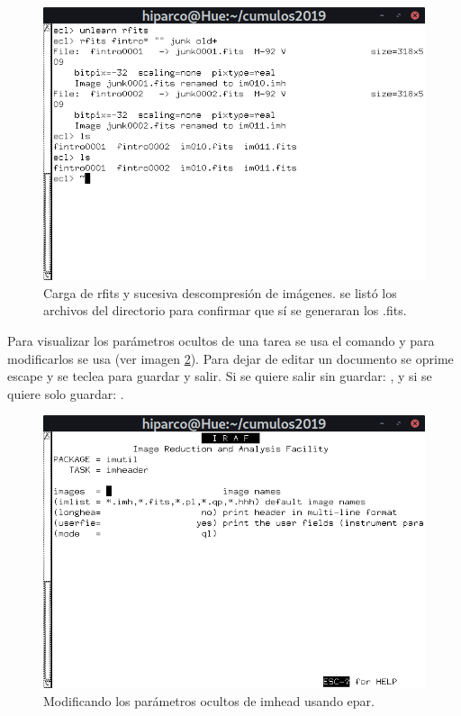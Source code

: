 \documentclass[12pt]{article}
\begin{document}
\begin{figure}[H]
  \centering
   \includegraphics[scale= 0.65]{im01.png}
  \caption{Carga de rfits y sucesiva descompresión de imágenes. se listó los archivos del directorio para confirmar que sí se generaran los .fits. }
  \label{im01}
\end{figure}

Para visualizar los parámetros ocultos de una tarea se usa el comando  y para modificarlos se usa  (ver imagen \ref{im02}).
Para dejar de editar un documento se oprime escape y se teclea  para guardar y salir. Si se quiere salir sin guardar: , y si se quiere solo guardar: .
\begin{figure}[H]
  \centering
   \includegraphics[scale= 0.65]{im02.png}
  \caption{Modificando los parámetros ocultos de imhead usando epar.}
  \label{im02}
\end{figure}
\end{document}
